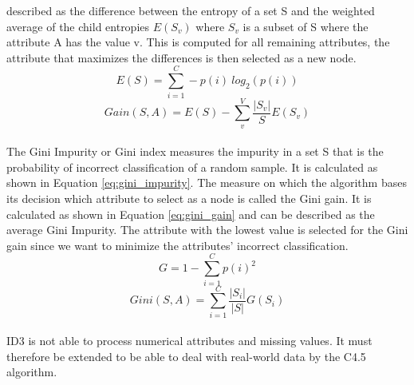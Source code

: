 described as the difference between the entropy of a set S and the 
weighted average of the child entropies $E(S_v)$ where $S_v$ is a subset of S 
where the attribute A has the value v. This is computed for all remaining 
attributes, the attribute that maximizes the differences is then selected as a 
new node.\cite{RN165}
\begin{equation}
 E(S) = \sum_{i=1}^C -p(i) \ log_2(p(i))
 \label{eq:entropy}
\end{equation}
\begin{equation}
 Gain(S, A) = E(S) - \sum_{v}^{V} \frac{|S_v|}{S} E(S_v)
 \label{eq:gain}
\end{equation}
\\
The Gini Impurity or Gini index measures the impurity in a set S that is the 
probability of incorrect classification of a random sample. It is calculated 
as shown in Equation \ref{eq:gini_impurity}. The measure on which the algorithm 
bases its decision which attribute to select as a node is called the Gini 
gain. It is calculated as shown in Equation \ref{eq:gini_gain} and can be 
described as the average Gini Impurity. The attribute with the lowest value is 
selected for the Gini gain since we want to minimize the attributes' incorrect 
classification. \cite{RN171}
\begin{equation}
 G = 1 - \sum_{i=1}^C p(i)^2
 \label{eq:gini_impurity}
\end{equation}
\begin{equation}
 Gini(S, A) = \sum_{i=1}^C \frac{|S_i|}{|S|} G(S_i)
 \label{eq:gini_gain}
\end{equation}
\\
ID3 is not able to process numerical attributes and missing values. It must 
therefore be extended to be able to deal with real-world data by the C4.5 
algorithm.
